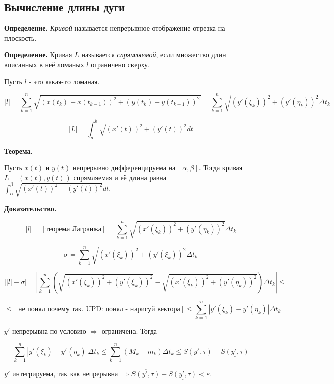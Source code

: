 \documentclass[a4paper]{article}
\begin{document}
\begin{definit}
\hypertarget{p20}{}
\subsection*{Вычисление длины дуги}

\textbf{Определение.} \textit{Кривой} называется непрерывное отображение отрезка на плоскость.

\textbf{Определение.}  Кривая $L$ называется \textit{спрямляемой}, если множество длин вписанных в неё ломаных $l$ ограничено сверху.

Пусть $l$ - это какая-то ломаная. 

\[
|l| = \sum_{k=1}^n \sqrt{(x(t_k) - x(t_{k-1}))^2 + (y(t_k) - y(t_{k-1}))^2} = \sum_{k=1}^n \sqrt{(y'(\xi_k))^2 + (y'(\eta_k))^2} \Delta t_k
\]

\[
|L| =  \int_a^b \sqrt{(x'(t))^2 + (y'(t))^2} dt
\]

\begin{htheorem}\textbf{Теорема}.

Пусть $x(t)$ и $y(t)$ непрерывно дифференцируема на $[\alpha, \beta]$. Тогда кривая
$L =(x(t), y(t))$ спрямляемая и её длина равна $\int_{\alpha}^{\beta} \sqrt{(x'(t))^2+(y'(t))^2} dt$.
\end{htheorem}

\begin{hproof}\textbf{Доказательство.}


\[
|l| = [\text{теорема Лагранжа}] = \sum_{k=1}^n \sqrt{(x'(\xi_k))^2 + (y'(\eta_k))^2} \Delta t_k
\]

\[
\sigma = \sum_{k=1}^n \sqrt{(x'(\xi_k))^2 + (y'(\xi_k))^2} \Delta t_k
\]

\[
\left| |l| - \sigma \right| = \left| \sum_{k=1}^n \left( \sqrt{(x'(\xi_k))^2 + (y'(\xi_k))^2} - \sqrt{(x'(\xi_k))^2 + (y'(\eta_k))^2} \right) \Delta t_k \right| \leq 
\]

\[
\leq [\text{не понял почему так. UPD: понял - нарисуй вектора}] \leq \sum_{k=1}^n \left| y'(\xi_k) - y'(\eta_k) \right| \Delta t_k
\]

$y'$ непрерывна по условию $\Rightarrow$ ограничена. Тогда 

\[
\sum_{k=1}^n \left| y'(\xi_k) - y'(\eta_k) \right| \Delta t_k \leq \sum_{k=1}^n (M_k - m_k) \Delta t_k \leq \overline{S(y', \tau)} - \underline{S(y', \tau)}
\]

$y'$ интегрируема, так как непрерывна $\Rightarrow \overline{S(y', \tau)} - \underline{S(y', \tau)} < \varepsilon$.


\end{hproof}
\end{definit}
\end{document}
